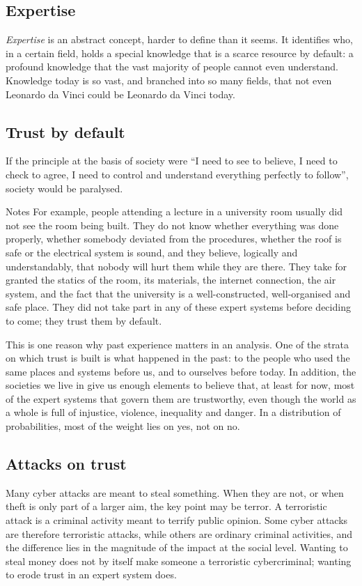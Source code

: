 \subsection{Expertise}
\emph{Expertise} is an abstract concept, harder to define than it seems. It identifies who, in a certain field, holds a special knowledge that is a scarce resource by default: a profound knowledge that the vast majority of people cannot even understand. Knowledge today is so vast, and branched into so many fields, that not even Leonardo da Vinci could be Leonardo da Vinci today.

\subsection{Trust by default}
If the principle at the basis of society were ``I need to see to believe, I need to check to agree, I need to control and understand everything perfectly to follow'', society would be paralysed.

\begin{nota}{Notes}
	For example, people attending a lecture in a university room usually did not see the room being built. They do not know whether everything was done properly, whether somebody deviated from the procedures, whether the roof is safe or the electrical system is sound, and they believe, logically and understandably, that nobody will hurt them while they are there. They take for granted the statics of the room, its materials, the internet connection, the air system, and the fact that the university is a well-constructed, well-organised and safe place. They did not take part in any of these expert systems before deciding to come; they trust them by default.
\end{nota}

This is one reason why past experience matters in an analysis. One of the strata on which trust is built is what happened in the past: to the people who used the same places and systems before us, and to ourselves before today. In addition, the societies we live in give us enough elements to believe that, at least for now, most of the expert systems that govern them are trustworthy, even though the world as a whole is full of injustice, violence, inequality and danger. In a distribution of probabilities, most of the weight lies on yes, not on no.

\subsection{Attacks on trust}
Many cyber attacks are meant to steal something. When they are not, or when theft is only part of a larger aim, the key point may be terror. A terroristic attack is a criminal activity meant to terrify public opinion. Some cyber attacks are therefore terroristic attacks, while others are ordinary criminal activities, and the difference lies in the magnitude of the impact at the social level. Wanting to steal money does not by itself make someone a terroristic cybercriminal; wanting to erode trust in an expert system does.

